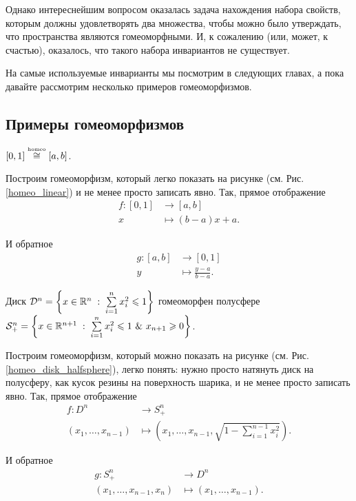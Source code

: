 Однако интереснейшим вопросом оказалась задача нахождения набора свойств, которым должны удовлетворять два множества, чтобы можно было утверждать, что пространства являются гомеоморфными. И, к сожалению (или, может, к счастью), оказалось, что такого набора инвариантов не существует.

На самые используемые инварианты мы посмотрим в следующих главах, а пока давайте рассмотрим несколько примеров гомеоморфизмов.

\subsection{Примеры гомеоморфизмов}
\begin{Ex}
    $[0,1] \overset{\text{\tiny homeo}}{\cong} [a,b]$.

    Построим гомеоморфизм, который легко показать на рисунке (см. Рис. \ref{homeo_linear}) и не менее просто записать явно.
    Так, прямое отображение 
    \[
        \begin{split}
            f: [0,1] &\to [a,b]\\
            x &\mapsto (b-a)x + a.
    \end{split}
    \] 

    И обратное 
    \[
    \begin{split}
        g: [a,b] &\to [0,1]\\
        y &\mapsto \frac{y-a}{b-a}.
    \end{split}
    \] 
\end{Ex}
\begin{Ex}
    Диск $\mathcal{D}^{n} = \left\{x\in \mathbb{R}^{n} \; : \; \sum\limits_{i=1}^{n} x_i^2 \leqslant  1\right\}$ гомеоморфен полусфере \\$\mathcal{S}^n_+ =  \left\{x\in \mathbb{R}^{n+1} \; : \; \sum\limits_{i=1}^{n} x_i^2 \leqslant  1 ~\&~ x_{n+1} \geqslant 0 \right\}$.

    Построим гомеоморфизм, который можно показать на рисунке (см. Рис. \ref{homeo_disk_halfsphere}), легко понять: нужно просто натянуть диск на полусферу, как кусок резины на поверхность шарика, и не менее просто записать явно.
    Так, прямое отображение 
    \[
    \begin{split}
        f: D^{n} &\to S^n_+\\
        (x_1, \dots, x_{n-1}) &\mapsto \left(x_1, \dots, x_{n-1}, \sqrt{1-\sum\limits_{i=1}^{n-1} x_i^2}\right).
    \end{split}
    \] 

    И обратное 
    \[
    \begin{split}
        g: S^n_+ &\to D^n\\
        (x_1, \dots, x_{n-1}, x_n) &\mapsto (x_1, \dots, x_{n-1}).
    \end{split}
    \] 
\end{Ex}
